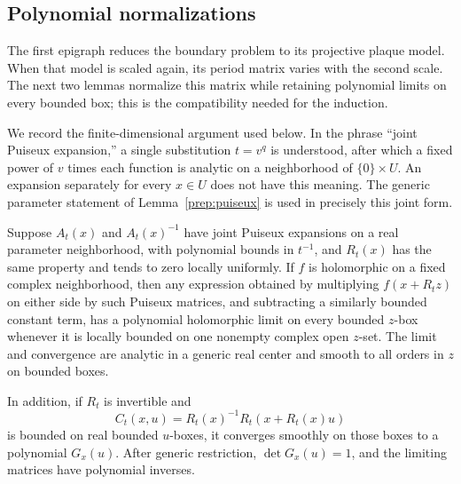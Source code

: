 \subsection{Polynomial normalizations}

The first epigraph reduces the boundary problem to its projective
plaque model. When that model is scaled again, its period matrix
varies with the second scale. The next two lemmas normalize this
matrix while retaining polynomial limits on every bounded box;
this is the compatibility needed for the induction.

We record the finite-dimensional argument used below.  In the phrase
``joint Puiseux expansion,'' a single substitution $t=v^q$ is understood,
after which a fixed power of $v$ times each function is analytic on
a neighborhood of $\{0\}\times U$.  An expansion separately for every
$x\in U$ does not have this meaning.  The generic parameter statement
of Lemma~\ref{prep:puiseux} is used in precisely this joint form.

\begin{lemma}\label{win:finite-taylor}
Suppose $A_t(x)$ and $A_t(x)^{-1}$ have joint Puiseux expansions on
a real parameter neighborhood, with polynomial bounds in $t^{-1}$,
and $R_t(x)$ has the same property and tends to zero locally uniformly.
If $f$ is holomorphic on a fixed complex neighborhood, then any
expression obtained by multiplying $f(x+R_tz)$ on either side by such
Puiseux matrices, and subtracting a similarly bounded constant term,
has a polynomial holomorphic limit on every bounded $z$-box whenever
it is locally bounded on one nonempty complex open $z$-set.  The limit
and convergence are analytic in a generic real center and smooth to
all orders in $z$ on bounded boxes.

In addition, if $R_t$ is invertible and
\[
       C_t(x,u)=R_t(x)^{-1}R_t(x+R_t(x)u)
\]
is bounded on real bounded $u$-boxes, it converges smoothly on those
boxes to a polynomial $G_x(u)$.  After generic restriction,
$\det G_x(u)=1$, and the limiting matrices have polynomial inverses.
\end{lemma}

